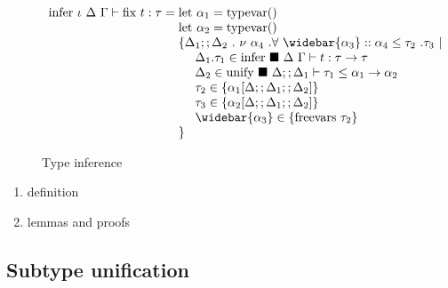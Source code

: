 \documentclass[sigplan,screen]{acmart}
\begin{document}
\begin{figure*}[h]
\[\begin{array}{l @{} l}
      \text{infer } \iota\ \Delta\ \Gamma \vdash 
      \text{fix } t : \tau      
      &{} =
      \begin{array}[t]{@{} l}
        \text{let } \alpha_1 = \text{typevar}()
        \\
        \text{let } \alpha_2 = \text{typevar}()
        \\
        \{ \Delta_1;;\Delta_2\ .\ \nu\ \alpha_4 \ . \forall\ \widebar{\alpha_3} ::
          \alpha_4 \leq \tau_2\ .  \tau_3
          \ |\ 
        \\
        \ \ \ \ \Delta_1.\tau_1 \in
        \text{infer } \blacksquare\ \Delta\ \Gamma \vdash t : \tau \rightarrow \tau
        \\
        \ \ \ \ \Delta_2 \in \text{unify } \blacksquare\ \Delta;;\Delta_1 \vdash 
        \tau_1 \leq \alpha_1 \rightarrow \alpha_2 
        \\
        \ \ \ \ \tau_2 \in \{\alpha_1[\Delta;;\Delta_1;;\Delta_2]\}
        \\ 
        \ \ \ \ \tau_3 \in \{\alpha_2[\Delta;;\Delta_1;;\Delta_2]\} 
        \\
        \ \ \ \ \widebar{\alpha_3} \in \{ \text{freevars}\ \tau_2 \}
        \\
        \} 
      \end{array}
    \end{array}
  \]
  \caption{Type inference}
\end{figure*}


\begin{enumerate}
  \item definition 
  \item lemmas and proofs 
\end{enumerate}

\subsection{Subtype unification}
\end{document}
